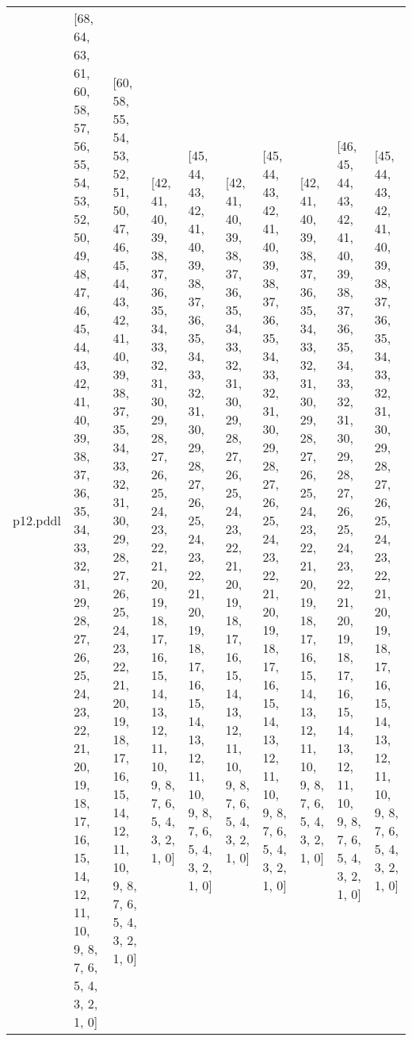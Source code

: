 \documentclass{article}
\begin{document}
\begin{tabular}{@{}lrrrrrrrrr@{}}
p12.pddl & \multicolumn{1}{|l|}{[68, 64, 63, 61, 60, 58, 57, 56, 55, 54, 53, 52, 50, 49, 48, 47, 46, 45, 44, 43, 42, 41, 40, 39, 38, 37, 36, 35, 34, 33, 32, 31, 29, 28, 27, 26, 25, 24, 23, 22, 21, 20, 19, 18, 17, 16, 15, 14, 12, 11, 10, 9, 8, 7, 6, 5, 4, 3, 2, 1, 0]} & \multicolumn{1}{|l|}{[60, 58, 55, 54, 53, 52, 51, 50, 47, 46, 45, 44, 43, 42, 41, 40, 39, 38, 37, 35, 34, 33, 32, 31, 30, 29, 28, 27, 26, 25, 24, 23, 22, 21, 20, 19, 18, 17, 16, 15, 14, 12, 11, 10, 9, 8, 7, 6, 5, 4, 3, 2, 1, 0]} & \multicolumn{1}{|l|}{[42, 41, 40, 39, 38, 37, 36, 35, 34, 33, 32, 31, 30, 29, 28, 27, 26, 25, 24, 23, 22, 21, 20, 19, 18, 17, 16, 15, 14, 13, 12, 11, 10, 9, 8, 7, 6, 5, 4, 3, 2, 1, 0]} & \multicolumn{1}{|l|}{[45, 44, 43, 42, 41, 40, 39, 38, 37, 36, 35, 34, 33, 32, 31, 30, 29, 28, 27, 26, 25, 24, 23, 22, 21, 20, 19, 18, 17, 16, 15, 14, 13, 12, 11, 10, 9, 8, 7, 6, 5, 4, 3, 2, 1, 0]} & \multicolumn{1}{|l|}{[42, 41, 40, 39, 38, 37, 36, 35, 34, 33, 32, 31, 30, 29, 28, 27, 26, 25, 24, 23, 22, 21, 20, 19, 18, 17, 16, 15, 14, 13, 12, 11, 10, 9, 8, 7, 6, 5, 4, 3, 2, 1, 0]} & \multicolumn{1}{|l|}{[45, 44, 43, 42, 41, 40, 39, 38, 37, 36, 35, 34, 33, 32, 31, 30, 29, 28, 27, 26, 25, 24, 23, 22, 21, 20, 19, 18, 17, 16, 15, 14, 13, 12, 11, 10, 9, 8, 7, 6, 5, 4, 3, 2, 1, 0]} & \multicolumn{1}{|l|}{[42, 41, 40, 39, 38, 37, 36, 35, 34, 33, 32, 31, 30, 29, 28, 27, 26, 25, 24, 23, 22, 21, 20, 19, 18, 17, 16, 15, 14, 13, 12, 11, 10, 9, 8, 7, 6, 5, 4, 3, 2, 1, 0]} & \multicolumn{1}{|l|}{[46, 45, 44, 43, 42, 41, 40, 39, 38, 37, 36, 35, 34, 33, 32, 31, 30, 29, 28, 27, 26, 25, 24, 23, 22, 21, 20, 19, 18, 17, 16, 15, 14, 13, 12, 11, 10, 9, 8, 7, 6, 5, 4, 3, 2, 1, 0]} & \multicolumn{1}{|l|}{[45, 44, 43, 42, 41, 40, 39, 38, 37, 36, 35, 34, 33, 32, 31, 30, 29, 28, 27, 26, 25, 24, 23, 22, 21, 20, 19, 18, 17, 16, 15, 14, 13, 12, 11, 10, 9, 8, 7, 6, 5, 4, 3, 2, 1, 0]} \\

\end{tabular}
\end{document}

